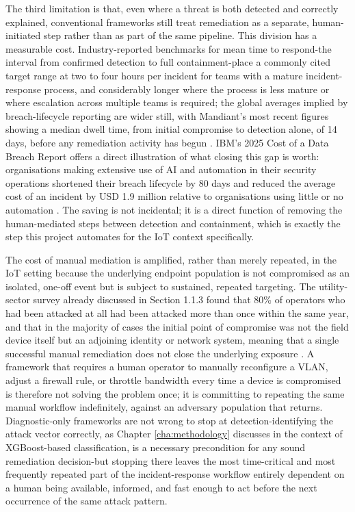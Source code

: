 The third limitation is that, even where a threat is both detected and correctly explained, conventional frameworks still treat remediation as a separate, human-initiated step rather than as part of the same pipeline. This division has a measurable cost. Industry-reported benchmarks for mean time to respond-the interval from confirmed detection to full containment-place a commonly cited target range at two to four hours per incident for teams with a mature incident-response process, and considerably longer where the process is less mature or where escalation across multiple teams is required; the global averages implied by breach-lifecycle reporting are wider still, with Mandiant's most recent figures showing a median dwell time, from initial compromise to detection alone, of 14 days, before any remediation activity has begun \cite{Mandiant2026}. IBM's 2025 Cost of a Data Breach Report offers a direct illustration of what closing this gap is worth: organisations making extensive use of AI and automation in their security operations shortened their breach lifecycle by 80 days and reduced the average cost of an incident by USD 1.9 million relative to organisations using little or no automation \cite{IBM2025}. The saving is not incidental; it is a direct function of removing the human-mediated steps between detection and containment, which is exactly the step this project automates for the IoT context specifically.

The cost of manual mediation is amplified, rather than merely repeated, in the IoT setting because the underlying endpoint population is not compromised as an isolated, one-off event but is subject to sustained, repeated targeting. The utility-sector survey already discussed in Section 1.1.3 found that 80\% of operators who had been attacked at all had been attacked more than once within the same year, and that in the majority of cases the initial point of compromise was not the field device itself but an adjoining identity or network system, meaning that a single successful manual remediation does not close the underlying exposure \cite{Semperis2025}. A framework that requires a human operator to manually reconfigure a VLAN, adjust a firewall rule, or throttle bandwidth every time a device is compromised is therefore not solving the problem once; it is committing to repeating the same manual workflow indefinitely, against an adversary population that returns. Diagnostic-only frameworks are not wrong to stop at detection-identifying the attack vector correctly, as Chapter \ref{cha:methodology} discusses in the context of XGBoost-based classification, is a necessary precondition for any sound remediation decision-but stopping there leaves the most time-critical and most frequently repeated part of the incident-response workflow entirely dependent on a human being available, informed, and fast enough to act before the next occurrence of the same attack pattern.

